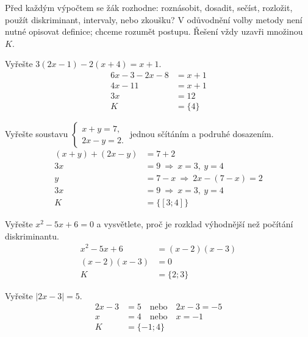 \documentclass[11pt,a4paper]{article}
\begin{document}
Před každým výpočtem se žák rozhodne: roznásobit, dosadit, sečíst, rozložit, použít diskriminant, intervaly, nebo zkoušku? V odůvodnění volby metody není nutné opisovat definice; chceme rozumět postupu. Řešení vždy uzavři množinou $K$.
\begin{prikladReseniBox}[title={Příklad 1}]
Vyřešte $3(2x-1)-2(x+4)=x+1$.
\tcblower
\[
\begin{aligned}
6x-3-2x-8&=x+1\\
4x-11&=x+1\\
3x&=12\\
K&=\{4\}
\end{aligned}
\]

\end{prikladReseniBox}
\begin{prikladReseniBox}[title={Příklad 2}]
Vyřešte soustavu $\begin{cases}x+y=7,\\2x-y=2.\end{cases}$ jednou sčítáním a podruhé dosazením.
\tcblower
\[
\begin{aligned}
(x+y)+(2x-y)&=7+2\\
3x&=9\ \Rightarrow\ x=3,\ y=4\\
y&=7-x\ \Rightarrow\ 2x-(7-x)=2\\
3x&=9\ \Rightarrow\ x=3,\ y=4\\
K&=\{[3;4]\}
\end{aligned}
\]

\end{prikladReseniBox}
\begin{prikladReseniBox}[title={Příklad 3}]
Vyřešte $x^2-5x+6=0$ a vysvětlete, proč je rozklad výhodnější než počítání diskriminantu.
\tcblower
\[
\begin{aligned}
x^2-5x+6&=(x-2)(x-3)\\
(x-2)(x-3)&=0\\
K&=\{2;3\}
\end{aligned}
\]

\end{prikladReseniBox}
\begin{prikladReseniBox}[title={Příklad 4}]
Vyřešte $|2x-3|=5$.
\tcblower
\[
\begin{aligned}
2x-3&=5\quad\text{nebo}\quad2x-3=-5\\
x&=4\quad\text{nebo}\quad x=-1\\
K&=\{-1;4\}
\end{aligned}
\]

\end{prikladReseniBox}
\end{document}
